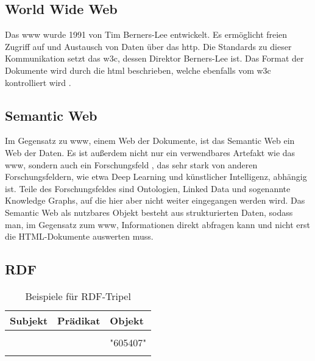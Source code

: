 \subsection{World Wide Web}
Das \ac{www} wurde 1991 von Tim Berners-Lee entwickelt.
Es ermöglicht freien Zugriff auf und Austausch von Daten über das \ac{http}.
Die Standards zu dieser Kommunikation setzt das \ac{w3c}, dessen Direktor Berners-Lee ist.
Das Format der Dokumente wird durch die \ac{html} beschrieben, welche ebenfalls vom \ac{w3c} kontrolliert wird \citep{www}.

\subsection{Semantic Web}
Im Gegensatz zu \ac{www}, einem Web der Dokumente, ist das Semantic Web ein Web der Daten.
Es ist außerdem nicht nur ein verwendbares Artefakt wie das \ac{www}, sondern auch ein Forschungsfeld \citep{semanticwebreview}, das sehr stark von anderen Forschungsfeldern, wie etwa Deep Learning und künstlicher Intelligenz, abhängig ist. Teile des Forschungsfeldes sind Ontologien, Linked Data und sogenannte Knowledge Graphs, auf die hier aber nicht weiter eingegangen werden wird.
Das Semantic Web als nutzbares Objekt besteht aus strukturierten Daten, sodass man, im Gegensatz zum \ac{www}, Informationen direkt abfragen kann und nicht erst die HTML-Dokumente auswerten muss.

\subsection{RDF}

\begin{table}[h]\centering\scriptsize
  \begin{tabulary}{\textwidth}{rcl}
    \toprule
    Subjekt & Prädikat & Objekt \\
    \midrule
     &  &  \\
     &  & "605407"  \\
     &  &  \\
    \bottomrule
  \end{tabulary}
  \caption{Beispiele für RDF-Tripel}
  \label{tab:rdftripleexample}
\end{table}


